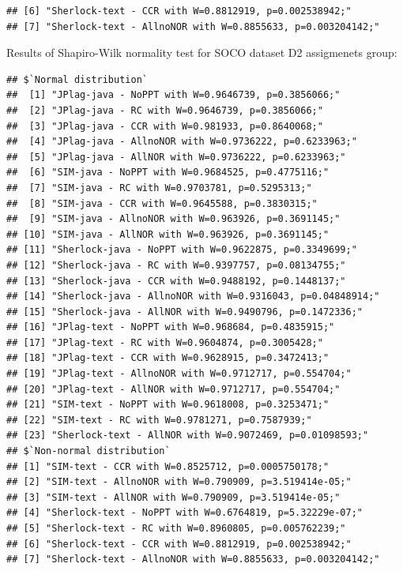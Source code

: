 \documentclass[a4paper, 12pt, oneside, openany, final, pdftex]{book}\usepackage[]{graphicx}\usepackage[]{color}
\makeatletter
\newenvironment{kframe}{%
 \def\at@end@of@kframe{}%
 \ifinner\ifhmode%
  \def\at@end@of@kframe{\end{minipage}}%
  \begin{minipage}{\columnwidth}%
 \fi\fi%
 \def\FrameCommand##1{\hskip\@totalleftmargin \hskip-\fboxsep
 \colorbox{shadecolor}{##1}\hskip-\fboxsep
     \hskip-\linewidth \hskip-\@totalleftmargin \hskip\columnwidth}%
 \MakeFramed {\advance\hsize-\width
   \@totalleftmargin\z@ \linewidth\hsize
   \@setminipage}}%
 {\par\unskip\endMakeFramed%
 \at@end@of@kframe}
\newenvironment{knitrout}{}{} %
\makeatother
\begin{document}
\begin{appendices}
\begin{knitrout}
\begin{kframe}
\begin{verbatim}
## [6] "Sherlock-text - CCR with W=0.8812919, p=0.002538942;"     
## [7] "Sherlock-text - AllnoNOR with W=0.8855633, p=0.003204142;"
\end{verbatim}
\end{kframe}
\end{knitrout}
\clearpage
Results of Shapiro-Wilk normality test for SOCO dataset D2 assigmenets group:
\begin{knitrout}
\color{fgcolor}\begin{kframe}
\begin{verbatim}
## $`Normal distribution`
##  [1] "JPlag-java - NoPPT with W=0.9646739, p=0.3856066;"       
##  [2] "JPlag-java - RC with W=0.9646739, p=0.3856066;"          
##  [3] "JPlag-java - CCR with W=0.981933, p=0.8640068;"          
##  [4] "JPlag-java - AllnoNOR with W=0.9736222, p=0.6233963;"    
##  [5] "JPlag-java - AllNOR with W=0.9736222, p=0.6233963;"      
##  [6] "SIM-java - NoPPT with W=0.9684525, p=0.4775116;"         
##  [7] "SIM-java - RC with W=0.9703781, p=0.5295313;"            
##  [8] "SIM-java - CCR with W=0.9645588, p=0.3830315;"           
##  [9] "SIM-java - AllnoNOR with W=0.963926, p=0.3691145;"       
## [10] "SIM-java - AllNOR with W=0.963926, p=0.3691145;"         
## [11] "Sherlock-java - NoPPT with W=0.9622875, p=0.3349699;"    
## [12] "Sherlock-java - RC with W=0.9397757, p=0.08134755;"      
## [13] "Sherlock-java - CCR with W=0.9488192, p=0.1448137;"      
## [14] "Sherlock-java - AllnoNOR with W=0.9316043, p=0.04848914;"
## [15] "Sherlock-java - AllNOR with W=0.9490796, p=0.1472336;"   
## [16] "JPlag-text - NoPPT with W=0.968684, p=0.4835915;"        
## [17] "JPlag-text - RC with W=0.9604874, p=0.3005428;"          
## [18] "JPlag-text - CCR with W=0.9628915, p=0.3472413;"         
## [19] "JPlag-text - AllnoNOR with W=0.9712717, p=0.554704;"     
## [20] "JPlag-text - AllNOR with W=0.9712717, p=0.554704;"       
## [21] "SIM-text - NoPPT with W=0.9618008, p=0.3253471;"         
## [22] "SIM-text - RC with W=0.9781271, p=0.7587939;"            
## [23] "Sherlock-text - AllNOR with W=0.9072469, p=0.01098593;"
## $`Non-normal distribution`
## [1] "SIM-text - CCR with W=0.8525712, p=0.0005750178;"         
## [2] "SIM-text - AllnoNOR with W=0.790909, p=3.519414e-05;"     
## [3] "SIM-text - AllNOR with W=0.790909, p=3.519414e-05;"       
## [4] "Sherlock-text - NoPPT with W=0.6764819, p=5.32229e-07;"   
## [5] "Sherlock-text - RC with W=0.8960805, p=0.005762239;"      
## [6] "Sherlock-text - CCR with W=0.8812919, p=0.002538942;"     
## [7] "Sherlock-text - AllnoNOR with W=0.8855633, p=0.003204142;"
\end{verbatim}
\end{kframe}
\end{knitrout}
\clearpage

\end{appendices}
\end{document}
